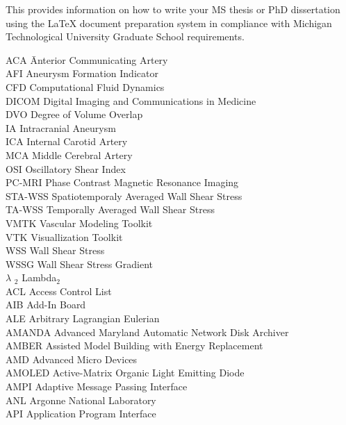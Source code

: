 %

This provides information on how to write your MS thesis or PhD dissertation 
using the \LaTeX{} document preparation system in compliance with Michigan 
Technological University Graduate School requirements.

\begin{tabbing}
ACA		\hspace{0.60in} \= Anterior Communicating Artery  \\
AFI		\> Aneurysm Formation Indicator \\
CFD		\> Computational Fluid Dynamics \\
DICOM	\> Digital Imaging and Communications in Medicine \\
DVO		\> Degree of Volume Overlap \\
IA  	\> Intracranial Aneurysm \\
ICA		\> Internal Carotid Artery \\
MCA		\> Middle Cerebral Artery \\
OSI		\> Oscillatory Shear Index \\
PC-MRI	\> Phase Contrast Magnetic Resonance Imaging \\
STA-WSS	\> Spatiotemporaly Averaged Wall Shear Stress \\
TA-WSS	\> Temporally Averaged Wall Shear Stress \\
VMTK	\> Vascular Modeling Toolkit \\
VTK		\> Visuallization Toolkit \\
WSS		\> Wall Shear Stress \\
WSSG	\> Wall Shear Stress Gradient \\
$\lambda$ $_2$	\> Lambda$_2$ \\
ACL     \> Access Control List\\
AIB     \> Add-In Board\\
ALE     \> Arbitrary Lagrangian Eulerian\\
AMANDA  \> Advanced Maryland Automatic Network Disk Archiver\\
AMBER   \> Assisted Model Building with Energy Replacement\\
AMD     \> Advanced Micro Devices\\
AMOLED  \> Active-Matrix Organic Light Emitting Diode\\
AMPI    \> Adaptive Message Passing Interface\\
ANL     \> Argonne National Laboratory\\
API     \> Application Program Interface\\

\end{tabbing}
